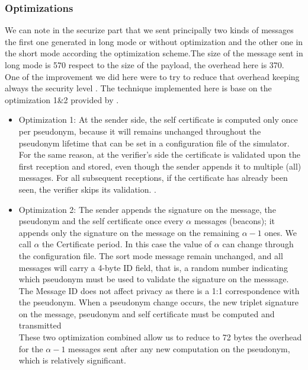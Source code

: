 \subsubsection{Optimizations}
We can note in the securize part  that we sent principally two kinds of messages the first one generated in long mode or without optimization and the other one in the short mode according the optimization scheme.The size of the message sent in long mode is 570 respect to the size of the payload, the overhead here is 370.\\
 One of the improvement we did here were to try to reduce that overhead keeping always the security level . The technique implemented  here is base on the  optimization 1\&2 provided by \cite{calandriello}. \\
\begin{itemize}
 \item Optimization 1: At the sender side, the self certificate  is computed only once per pseudonym, because it will remains unchanged throughout the pseudonym lifetime that can be set in a configuration file of the simulator. For the same reason, at the verifier's side the certificate is validated upon the first reception and stored, even though the sender appends it to multiple (all) messages. For all subsequent receptions, if the certificate has already been seen, the verifier skips its validation.
 .\\
 \item Optimization 2: The sender appends  the signature on the message, the pseudonym and the self certificate once  every $\alpha$ messages (beacons); it appends only the signature on the message  on the remaining $\alpha-1$ ones. We call $\alpha$ the Certificate period. In this case the value of $\alpha$ can change through the configuration file. The sort mode message remain  unchanged, and all messages will carry a 4-byte  ID field, that is, a random number indicating which pseudonym must be used to validate the signature on the messsage. The Message ID does not affect privacy as there is a 1:1 correspondence with the pseudonym. When a pseudonym change occurs, the new triplet signature on the message, pseudonym and self certificate  must be computed and transmitted\\
  These two optimization combined allow us to reduce to 72 bytes the overhead for the $\alpha-1$ messages sent after any new computation on the pseudonym, which is relatively significant.
\end{itemize}